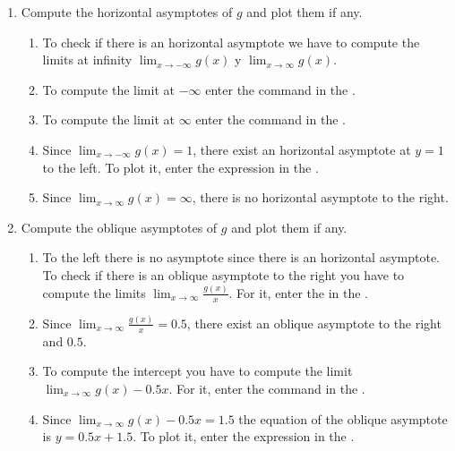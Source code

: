 \begin{enumerate}[leftmargin=*]
\begin{enumerate}
      \item Compute the horizontal asymptotes of $g$ and plot them if any.
            \begin{indication}
            \begin{enumerate}
            \item To check if there is an horizontal asymptote we have to compute the limits at infinity $\lim_{x\rightarrow -\infty} g(x)$ y $\lim_{x\rightarrow \infty} g(x)$.
            \item To compute the limit at $-\infty$ enter the command  in the .
            \item To compute the limit at $\infty$ enter the command  in the .
            \item Since $\lim_{x\rightarrow -\infty} g(x)=1$, there exist an horizontal asymptote at $y=1$ to the left.
                  To plot it, enter the expression  in the .
            \item Since $\lim_{x\rightarrow \infty} g(x)=\infty$, there is no horizontal asymptote to the right.
            \end{enumerate}
            \end{indication}

      \item Compute the oblique asymptotes of $g$ and plot them if any.
            \begin{indication}
            \begin{enumerate}
            \item To the left there is no asymptote since there is an horizontal asymptote.
                  To check if there is an oblique asymptote to the right you have to compute the limits $\lim_{x\rightarrow \infty}\frac{g(x)}{x}$.
                  For it, enter the  in the .
            \item Since $\lim_{x\rightarrow \infty}\frac{g(x)}{x}=0.5$, there exist an oblique asymptote to the right and $0.5$.
            \item To compute the intercept you have to compute the limit $\lim_{x\rightarrow \infty}g(x)-0.5x$.
                  For it, enter the command  in the .
            \item Since $\lim_{x\rightarrow \infty}g(x)-0.5x=1.5$ the equation of the oblique asymptote is $y=0.5x+1.5$.
                  To plot it, enter the expression  in the .
            \end{enumerate}
            \end{indication}
      \end{enumerate}


\end{enumerate}
